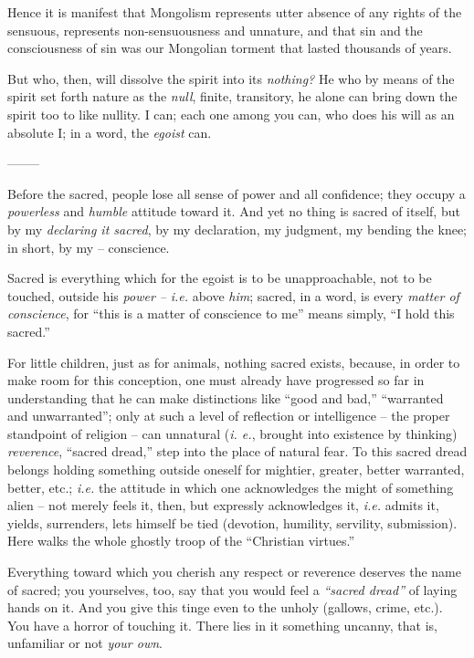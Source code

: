 \documentclass[12pt,a4paper]{book}
\begin{document}
Hence it is manifest that Mongolism represents utter absence of any rights of 
the sensuous, represents non-sensuousness and unnature, and that sin and the 
consciousness of sin was our Mongolian torment that lasted thousands of years.

But who, then, will dissolve the spirit into its \textit{nothing?} He who by 
means of the spirit set forth nature as the \textit{null}, finite, transitory, 
he alone can bring down the spirit too to like nullity. I can; each one among 
you can, who does his will as an absolute I; in a word, the \textit{egoist} 
can.

\begin{center}
--------\end{center}


Before the sacred, people lose all sense of power and all confidence; they 
occupy a \textit{powerless} and \textit{humble} attitude toward it. And yet no 
thing is sacred of itself, but by my \textit{declaring it sacred}, by my 
declaration, my judgment, my bending the knee; in short, by my -- conscience.

Sacred is everything which for the egoist is to be unapproachable, not to be 
touched, outside his \textit{power --} \textit{i.e.} above \textit{him}; 
sacred, in a word, is every \textit{matter of conscience}, for ``this is a 
matter of conscience to me'' means simply, ``I hold this sacred.''

For little children, just as for animals, nothing sacred exists, because, in 
order to make room for this conception, one must already have progressed so 
far in understanding that he can make distinctions like ``good and bad,'' 
``warranted and unwarranted''; only at such a level of reflection or 
intelligence -- the proper standpoint of religion -- can unnatural (\textit{i. 
e.}, brought into existence by thinking) \textit{reverence}, ``sacred 
dread,'' step into the place of natural fear. To this sacred dread belongs 
holding something outside oneself for mightier, greater, better warranted, 
better, etc.; \textit{i.e.} the attitude in which one acknowledges the might 
of something alien -- not merely feels it, then, but expressly acknowledges 
it, \textit{i.e.} admits it, yields, surrenders, lets himself be tied 
(devotion, humility, servility, submission). Here walks the whole ghostly 
troop of the ``Christian virtues.''

Everything toward which you cherish any respect or reverence deserves the name 
of sacred; you yourselves, too, say that you would feel a \textit{``sacred 
dread''} of laying hands on it. And you give this tinge even to the unholy 
(gallows, crime, etc.). You have a horror of touching it. There lies in it 
something uncanny, that is, unfamiliar or not \textit{your own}.
\end{document}
